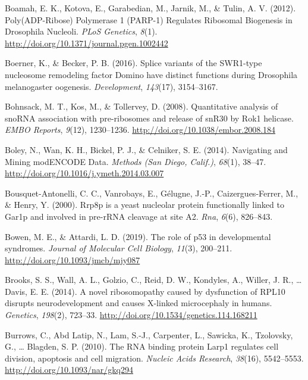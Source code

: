 \documentclass[12pt,oneside]{reedthesis}
\newlength{\cslhangindent}
\newenvironment{cslreferences}%
  {\setlength{\parindent}{0pt}%
  \everypar{\setlength{\hangindent}{\cslhangindent}}\ignorespaces}%
  {\par}
\begin{document}
\begin{cslreferences}
\leavevmode\hypertarget{ref-boamahPolyADPRibosePolymerase2012}{}%
Boamah, E. K., Kotova, E., Garabedian, M., Jarnik, M., \& Tulin, A. V. (2012). Poly(ADP-Ribose) Polymerase 1 (PARP-1) Regulates Ribosomal Biogenesis in Drosophila Nucleoli. \emph{PLoS Genetics}, \emph{8}(1). \url{http://doi.org/10.1371/journal.pgen.1002442}

\leavevmode\hypertarget{ref-Boerner2016}{}%
Boerner, K., \& Becker, P. B. (2016). Splice variants of the SWR1-type nucleosome remodeling factor Domino have distinct functions during Drosophila melanogaster oogenesis. \emph{Development}, \emph{143}(17), 3154--3167.

\leavevmode\hypertarget{ref-bohnsackQuantitativeAnalysisSnoRNA2008}{}%
Bohnsack, M. T., Kos, M., \& Tollervey, D. (2008). Quantitative analysis of snoRNA association with pre-ribosomes and release of snR30 by Rok1 helicase. \emph{EMBO Reports}, \emph{9}(12), 1230--1236. \url{http://doi.org/10.1038/embor.2008.184}

\leavevmode\hypertarget{ref-boleyNavigatingMiningModENCODE2014}{}%
Boley, N., Wan, K. H., Bickel, P. J., \& Celniker, S. E. (2014). Navigating and Mining modENCODE Data. \emph{Methods (San Diego, Calif.)}, \emph{68}(1), 38--47. \url{http://doi.org/10.1016/j.ymeth.2014.03.007}

\leavevmode\hypertarget{ref-Bousquet-Antonelli2000a}{}%
Bousquet-Antonelli, C. C., Vanrobays, E., Gélugne, J.-P., Caizergues-Ferrer, M., \& Henry, Y. (2000). Rrp8p is a yeast nucleolar protein functionally linked to Gar1p and involved in pre-rRNA cleavage at site A2. \emph{Rna}, \emph{6}(6), 826--843.

\leavevmode\hypertarget{ref-bowenRoleP53Developmental2019}{}%
Bowen, M. E., \& Attardi, L. D. (2019). The role of p53 in developmental syndromes. \emph{Journal of Molecular Cell Biology}, \emph{11}(3), 200--211. \url{http://doi.org/10.1093/jmcb/mjy087}

\leavevmode\hypertarget{ref-Brooks2014b}{}%
Brooks, S. S., Wall, A. L., Golzio, C., Reid, D. W., Kondyles, A., Willer, J. R., \ldots{} Davis, E. E. (2014). A novel ribosomopathy caused by dysfunction of RPL10 disrupts neurodevelopment and causes X-linked microcephaly in humans. \emph{Genetics}, \emph{198}(2), 723--33. \url{http://doi.org/10.1534/genetics.114.168211}

\leavevmode\hypertarget{ref-burrowsRNABindingProtein2010}{}%
Burrows, C., Abd Latip, N., Lam, S.-J., Carpenter, L., Sawicka, K., Tzolovsky, G., \ldots{} Blagden, S. P. (2010). The RNA binding protein Larp1 regulates cell division, apoptosis and cell migration. \emph{Nucleic Acids Research}, \emph{38}(16), 5542--5553. \url{http://doi.org/10.1093/nar/gkq294}


\end{cslreferences}
\end{document}
